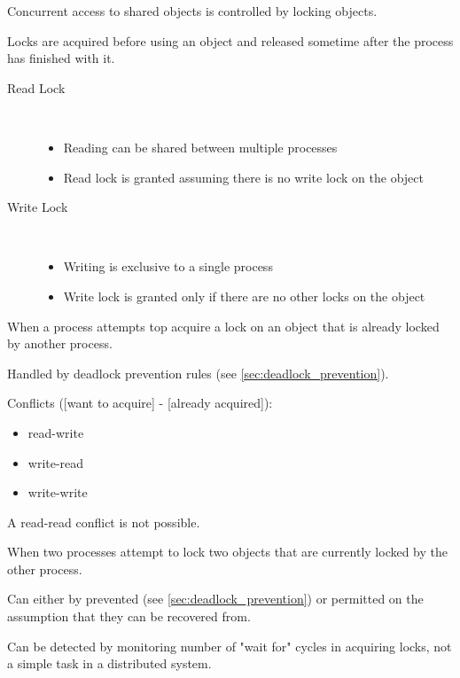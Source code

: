 \documentclass[a4paper]{article}
\begin{document}
Concurrent access to shared objects is controlled by locking objects.

Locks are acquired before using an object and released sometime after the
process has finished with it.

\begin{description}
  \item[Read Lock] \hfill \\
    \begin{itemize}
      \item Reading can be shared between multiple processes
      \item Read lock is granted assuming there is no write lock on the object
    \end{itemize}

  \item[Write Lock] \hfill \\
    \begin{itemize}
      \item Writing is exclusive to a single process
      \item Write lock is granted only if there are no other locks on the object
    \end{itemize}
\end{description}


When a process attempts top acquire a lock on an object that is already locked
by another process.

Handled by deadlock prevention rules (see \ref{sec:deadlock_prevention}).

Conflicts ([want to acquire] - [already acquired]):

\begin{itemize}
  \item read-write
  \item write-read
  \item write-write
\end{itemize}

A read-read conflict is not possible.


When two processes attempt to lock two objects that are currently locked by the
other process.

Can either by prevented (see \ref{sec:deadlock_prevention}) or permitted on the
assumption that they can be recovered from.

Can be detected by monitoring number of "wait for" cycles in acquiring locks,
not a simple task in a distributed system.
\end{document}
